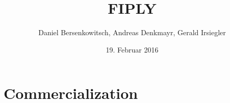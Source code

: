 \documentclass[a4paper, 12pt]{article}
\title{FIPLY}
\author{Daniel Bersenkowitsch, Andreas Denkmayr, Gerald Irsiegler}
\date{19. Februar 2016}
\begin{document}
\maketitle
\tableofcontents

\newpage

\newpage

\newpage

\newpage


\newpage
\section{Commercialization}



\newpage
\printbibliography
\end{document}

